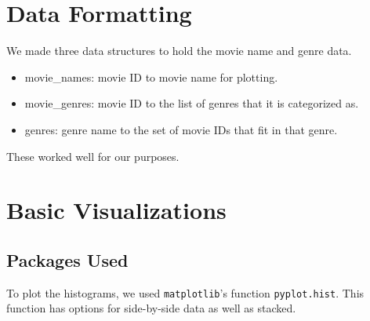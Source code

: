 \newif\ifshowsolutions
\showsolutionsfalse


\usepackage{listings}
\usepackage{caption}

\captionsetup{margin=0.5in}
\captionsetup{labelfont=bf}

\newcommand{\boldline}[1]{\underline{\textbf{#1}}}
\newcommand{\plotteddata}[3]{
  \begin{figure}[h!]
  \caption{#1}
  \centering
  \texttt{[image: \#2]}
  \end{figure}
}





\pagestyle{fancy}



\section{Data Formatting}
We made three data structures to hold the movie name and genre data.  
\begin{itemize}
    \item movie_names: movie ID to movie name for plotting.
    \item movie_genres: movie ID to the list of genres that it is categorized as.
    \item genres: genre name to the set of movie IDs that fit in that genre.
\end{itemize}
These worked well for our purposes.



\section{Basic Visualizations}

\subsection{Packages Used}
To plot the histograms, we used {\tt matplotlib}'s function {\tt pyplot.hist}.  This function has options for side-by-side data as well as stacked.

